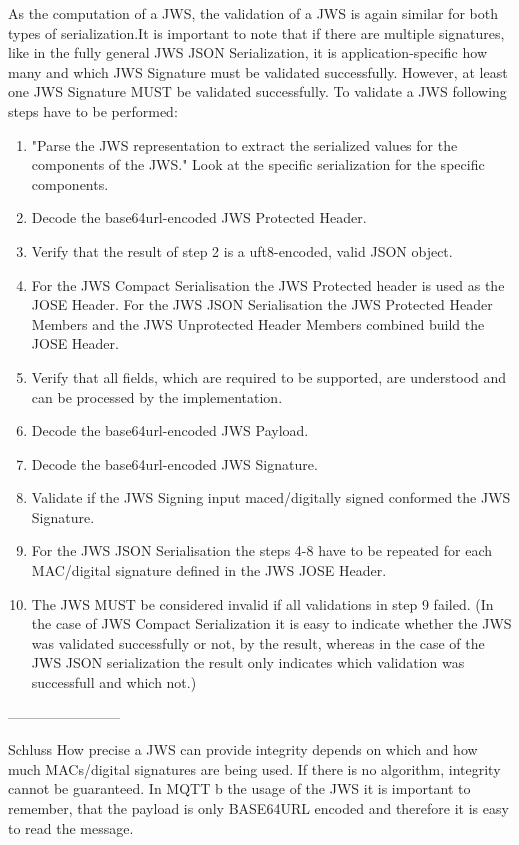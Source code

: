 As the computation of a JWS, the validation of a JWS is again similar for both types of serialization.It is important to note that if there are multiple signatures, like in the fully general JWS JSON Serialization,  it is application-specific how many and which JWS Signature must be validated successfully.\cite{rfc7515} However, at least one JWS Signature MUST be validated successfully.
To validate a JWS following steps have to be performed:\newline  
\begin{enumerate}
\item "Parse the JWS representation to extract the serialized values for the components of the JWS."\cite{rfc7515} Look at the specific serialization for the specific components.
\item Decode the base64url-encoded JWS Protected Header.
\item Verify that the result of step 2 is a uft8-encoded, valid JSON object.
\item For the JWS Compact Serialisation the JWS Protected header is used as the JOSE Header. For the JWS JSON Serialisation the JWS Protected Header Members and the JWS Unprotected Header Members combined build the JOSE Header.
\item Verify that all fields, which are required to be supported, are understood and can be processed by the implementation.

\item Decode the base64url-encoded JWS Payload.
\item Decode the base64url-encoded JWS Signature.
\item Validate if the JWS Signing input maced/digitally signed conformed the JWS Signature.
\item For the JWS JSON Serialisation the steps 4-8 have to be repeated for each MAC/digital signature defined in the JWS JOSE Header.
\item The JWS MUST be considered invalid if all validations in step 9 failed. (In the case of JWS Compact Serialization it is easy to indicate whether the JWS was validated successfully or not, by the result, whereas in the case of the JWS JSON serialization the result only indicates which validation was successfull and which not.)
\end{enumerate}
------------------------

Schluss 
How precise a JWS can provide integrity depends on which and how much MACs/digital signatures are being used. If there is no algorithm, integrity cannot be guaranteed. In MQTT 
b the usage of the JWS it is important to remember, that the payload is only BASE64URL encoded and therefore it is easy to read the message.